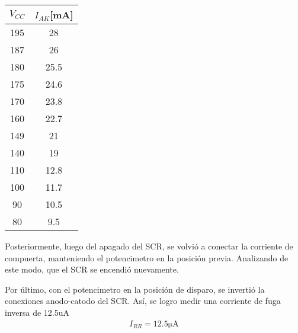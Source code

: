 \begin{minipage}{0.3\linewidth}
\begin{table}[H]
  \begin{center}
    \begin{tabular}{c|c}
      $V_{CC}$ &$I_{AK}$[mA]   \\
      \hline
      195   &28   \\
      187   &26  \\
      180   &25.5  \\
      175   &24.6  \\
      170   &23.8  \\
      160   &22.7  \\
      149   &21  \\
      140   &19  \\
      110   &12.8  \\
      100   &11.7  \\
      90    &10.5  \\
      80    &9.5  \\
    \end{tabular}
  \end{center} 
\end{table}
\end{minipage}
\begin{minipage}{0.7\linewidth}
  \centering
\end{minipage}
\par
Posteriormente, luego del apagado del SCR, se volvió a conectar la corriente de compuerta,
manteniendo el potencimetro en la posición previa. Analizando de este modo, que el SCR 
se encendió nuevamente.
\par
Por último, con el potencimetro en la posición de disparo, se invertió la conexiones 
anodo-catodo del SCR. Así, se logro medir una corriente de fuga inversa de 12.5uA
\begin{align}
  I_{RR} = 12.5\unit{\micro\ampere} 
\end{align}

